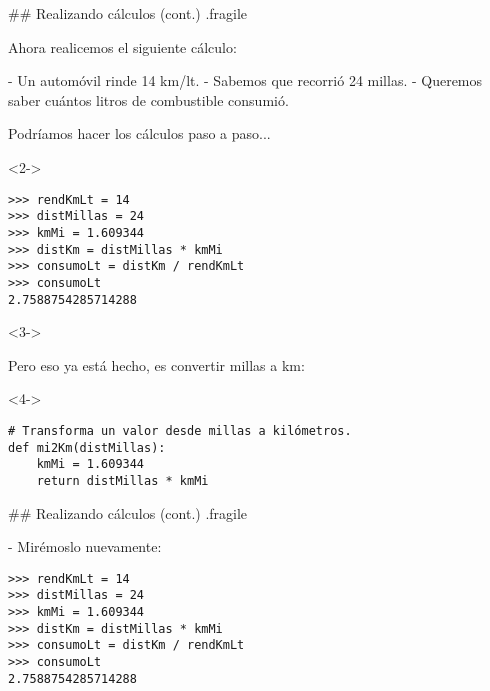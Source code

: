 ## Realizando cálculos (cont.) {.fragile}

Ahora realicemos el siguiente cálculo:

- Un automóvil rinde 14 km/lt.
- Sabemos que recorrió 24 millas.
- Queremos saber cuántos litros de combustible consumió.

\vspace{-.6ex}
\bgnblocknormal
Podríamos hacer los cálculos paso a paso...
\trmblocknormal

\begin{onlyenv}<2->

\bgncolumns
{}

\begin{lstlisting}[linebackgroundcolor={%
        \btLstHL<3->{3-4}%
}]
>>> rendKmLt = 14
>>> distMillas = 24
>>> kmMi = 1.609344
>>> distKm = distMillas * kmMi
>>> consumoLt = distKm / rendKmLt
>>> consumoLt
2.7588754285714288
\end{lstlisting}


<3->

\bgnblockalert
\footnotesize Pero eso ya está hecho, es convertir millas a km:
\trmblockalert

\begin{onlyenv}<4->
\begin{lstlisting}[linebackgroundcolor={%
        \btLstHL<4->{2-4}%
}]
# Transforma un valor desde millas a kilómetros.
def mi2Km(distMillas):
    kmMi = 1.609344
    return distMillas * kmMi
\end{lstlisting}
\end{onlyenv}

\trmcolumns

\end{onlyenv}


## Realizando cálculos (cont.) {.fragile}

- Mirémoslo nuevamente:

\vspace{-2ex}

\bgncolumns
{}
\begin{lstlisting}[linebackgroundcolor={%
        \btLstHL{3-4}%
}]
>>> rendKmLt = 14
>>> distMillas = 24
>>> kmMi = 1.609344
>>> distKm = distMillas * kmMi
>>> consumoLt = distKm / rendKmLt
>>> consumoLt
2.7588754285714288
\end{lstlisting}

